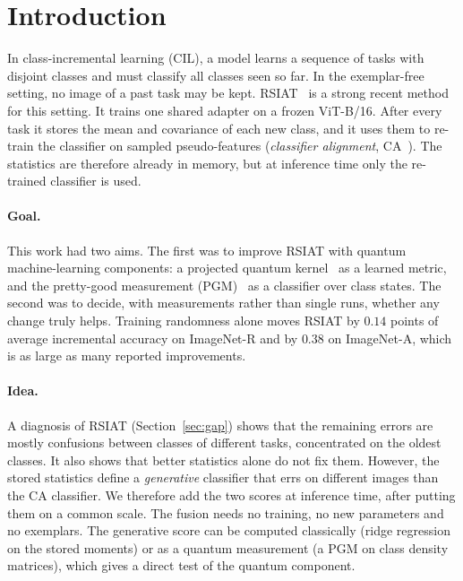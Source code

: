 \section{Introduction}
\label{sec:intro}

In class-incremental learning (CIL), a model learns a sequence of tasks with
disjoint classes and must classify all classes seen so far. In the
exemplar-free setting, no image of a past task may be kept. RSIAT~\cite{rsiat}
is a strong recent method for this setting. It trains one shared adapter on a
frozen ViT-B/16. After every task it stores the mean and covariance of each
new class, and it uses them to re-train the classifier on sampled
pseudo-features (\emph{classifier alignment}, CA~\cite{zhang2023slca}). The
statistics are therefore already in memory, but at inference time only the
re-trained classifier is used.

\paragraph{Goal.}
This work had two aims. The first was to improve RSIAT with quantum
machine-learning components: a projected quantum kernel~\cite{huang2021power}
as a learned metric, and the pretty-good measurement
(PGM)~\cite{hausladen1994pgm} as a classifier over class states. The second
was to decide, with measurements rather than single runs, whether any change
truly helps. Training randomness alone moves RSIAT by $0.14$ points of
average incremental accuracy on ImageNet-R and by $0.38$ on ImageNet-A, which
is as large as many reported improvements.

\paragraph{Idea.}
A diagnosis of RSIAT (Section~\ref{sec:gap}) shows that the remaining errors
are mostly confusions between classes of different tasks, concentrated on
the oldest classes. It also shows that better statistics alone do not fix
them. However, the stored statistics define a \emph{generative} classifier
that errs on different images than the CA classifier. We therefore add
the two scores at inference time, after putting them on a common scale. The
fusion needs no training, no new parameters and no exemplars. The generative
score can be computed classically (ridge regression on the stored moments)
or as a quantum measurement (a PGM on class density matrices), which gives a
direct test of the quantum component.

